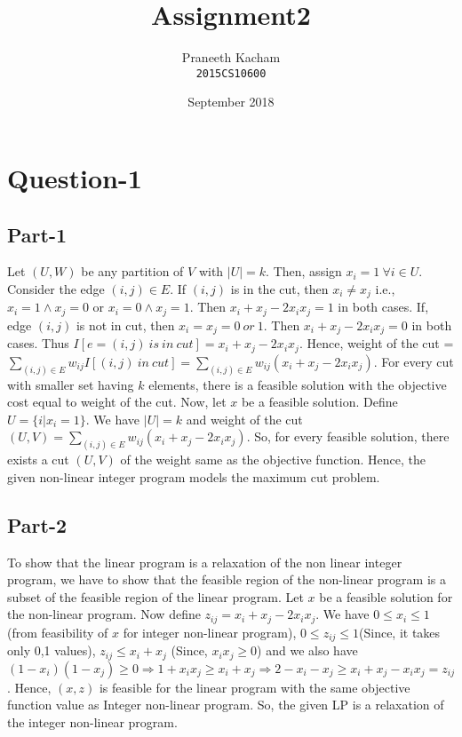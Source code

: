 \documentclass{article}
\title{Assignment2}
\author{Praneeth Kacham\\ \texttt{2015CS10600}}
\date{September 2018}
\newcommand{\set}[1]{\{#1\}}
\begin{document}
\maketitle
\section{Question-1}
\subsection{Part-1}
Let $(U,W)$ be any partition of $V$ with $|U| = k$. Then, assign $x_i = 1\ \forall i \in U$. Consider the edge $(i,j) \in E$. If $(i,j)$ is in the cut, then $x_i \ne x_j$ i.e., $x_i = 1 \land x_j = 0$ or $x_i = 0 \land x_j = 1$. Then $x_i + x_j - 2x_ix_j = 1$ in both cases. If, edge $(i,j)$ is not in cut, then $x_i = x_j = 0\ or\ 1$. Then $x_i + x_j - 2x_ix_j = 0$ in both cases. Thus $I[e = (i,j)\ is\ in\ cut] = x_i+x_j - 2x_ix_j$. Hence, weight of the cut = $\sum_{(i,j) \in E}w_{ij}I[(i,j)\ in\ cut] = \sum_{(i,j)\in E} w_{ij}(x_i + x_j - 2x_ix_j)$. For every cut with smaller set having $k$ elements, there is a feasible solution with the objective cost equal to weight of the cut. Now, let $x$ be a feasible solution. Define $U = \set{i | x_i = 1}$. We have $|U| = k$ and weight of the cut $(U,V) = \sum_{(i,j) \in E}w_{ij}(x_i + x_j - 2x_ix_j)$. So, for every feasible solution, there exists a cut $(U,V)$ of the weight same as the objective function. Hence, the given non-linear integer program models the maximum cut problem.

\subsection{Part-2}
To show that the linear program is a relaxation of the non linear integer program, we have to show that the feasible region of the non-linear program is a subset of the feasible region of the linear program. Let $x$ be a feasible solution for the non-linear program. Now define $z_{ij} = x_i + x_j - 2x_ix_j$. We have $0 \le x_i \le 1$ (from feasibility of $x$ for integer non-linear program), $0 \leq z_{ij} \leq 1$(Since, it takes only 0,1 values),  $z_{ij} \le x_i + x_j$ (Since, $x_ix_j \ge 0$) and we also have $(1 - x_i)(1 - x_j) \geq 0 \Rightarrow 1 + x_ix_j \geq x_i + x_j \Rightarrow 2 - x_i - x_j \geq x_i + x_j - x_ix_j = z_{ij}$. Hence, $(x,z)$ is feasible for the linear program with the same objective function value as Integer non-linear program. So, the given LP is a relaxation of the integer non-linear program.
\end{document}
